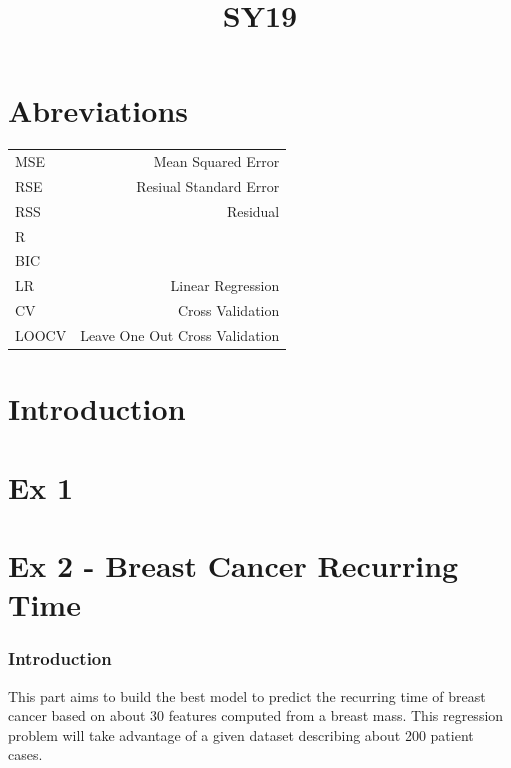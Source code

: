 \documentclass[]{report}
\title{SY19}
\author{}
\begin{document}
	

\maketitle

\part{Abreviations}
\begin{tabular}{l r}
	MSE & Mean Squared Error \\
	RSE & Resiual Standard Error\\ 
	RSS & Residual \\
	R & \\
	BIC \\
	LR & Linear Regression \\
	CV & Cross Validation \\
	LOOCV & Leave One Out Cross Validation \\
	
\end{tabular}
\begin{abstract}

\end{abstract}

\part{Introduction}

\part{Ex 1}

\part{Ex 2 - Breast Cancer Recurring Time}

\section{Introduction}
This part aims to build the best model to predict the recurring time of breast cancer based on about 30 features computed from a breast mass.  This regression problem will take advantage of a given dataset describing about 200 patient cases.
\end{document}
